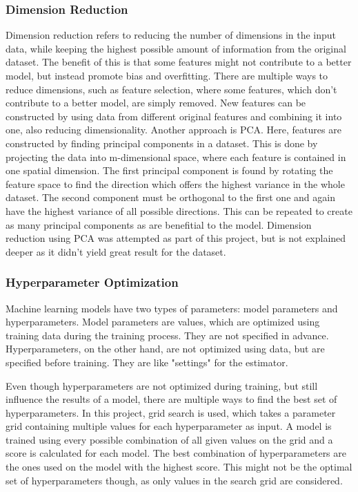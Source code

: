 \subsubsection{Dimension Reduction}
\label{sec:Dimension Reduction}

Dimension reduction refers to reducing the number of dimensions
in the input data, while keeping the highest possible amount of information from
the original dataset. The benefit of this is that some features might not contribute to a better model,
but instead promote bias and overfitting.
There are multiple ways to reduce dimensions, such as feature selection, where some features, which don't
contribute to a better model, are simply removed.
New features can be constructed by using data from different original features and
combining it into one, also reducing dimensionality.
Another approach is \ac{PCA}. Here, features are constructed by finding
principal components in a dataset. This is done by projecting the data into m-dimensional space,
where each feature is contained in one spatial dimension.
The first principal component is found by rotating the feature space to find the direction
which offers the highest variance in the whole dataset.
The second component must be orthogonal to the first one and again have the highest variance
of all possible directions. This can be repeated to create as many principal components as are benefitial to the model.
Dimension reduction using \ac{PCA} was attempted as part of this project,
but is not explained deeper as it didn't yield great result for the dataset.

\subsubsection{Hyperparameter Optimization}

Machine learning models have two types of parameters: model parameters and hyperparameters.
Model parameters are values, which are optimized using training data during the training process.
They are not specified in advance.
Hyperparameters, on the other hand, are not optimized using data, but are specified before training.
They are like "settings" for the estimator. 

Even though hyperparameters are not optimized during training, but still influence the results of a model,
there are multiple ways to find the best set of hyperparameters.
In this project, grid search is used, which takes a parameter grid containing
multiple values for each hyperparameter as input.
A model is trained using every possible combination of all given values on the grid and a score
is calculated for each model. The best combination of hyperparameters are the ones used on the model
with the highest score. This might not be the optimal set of hyperparameters though, as only values
in the search grid are considered.

